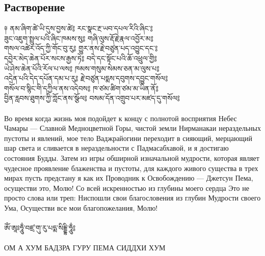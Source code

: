 \subsection{Растворение}
\vspace{0.5cm}
\ti
༈ ནམ་ཞིག་ཚེ་ཡི་དུས་བྱས་ཚེ༔ རང་སྣང་རྔ་ཡབ་དཔལ་རིའི་ཞིང་༔\\
ཟུང་འཇུག་སྤྲུལ་པའི་ཞིང་ཁམས་སུ༔ གཞི་ལུས་རྡོ་རྗེ་རྣལ་འབྱོར་མ༔\\
གསལ་འཚེར་འོད་ཀྱི་གོང་བུ་རུ༔ གྱུར་ནས་རྗེ་བཙུན་པད་འབྱུང་དང་༔\\
དབྱེར་མེད་ཆེན་པོར་སངས་རྒྱས་ཏེ༔ བདེ་དང་སྟོང་པའི་ཆོ་འཕྲུལ་གྱི༔\\
ཡེ་ཤེས་ཆེན་པོའི་རོལ་པ་ལས༔ ཁམས་གསུམ་སེམས་ཅན་མ་ལུས་པ༔\\
འདྲེན་པའི་དེད་དཔོན་དམ་པ་རུ༔ རྗེ་བཙུན་པདྨས་དབུགས་དབྱུང་གསོལ༔\\
གསོལ་བ་སྙིང་གི་དཀྱིལ་ནས་འདེབས༔ ཁ་ཙམ་ཚིག་ཙམ་མ་ཡིན་ནོ༔\\
བྱིན་རླབས་ཐུགས་ཀྱི་ཀློང་ནས་སྩོལ༔ བསམ་དོན་འགྲུབ་པར་མཛད་དུ་གསོལ༔\\
\\
\ru
Во время когда жизнь моя подойдет к концу
с полнотой восприятия Небес Чамары — Славной Медноцветной Горы,
чистой земли Нирманакаи нераздельных пустоты и явлений,
мое тело Ваджрайогини переходит в сияющий, мерцающий шар света
и сливается в нераздельности с Падмасабхавой,
и я достигаю состояния Будды.
Затем из игры обширной изначальной мудрости,
которая являет чудесное проявление блаженства и пустоты,
для каждого живого существа в трех мирах пусть предстану я как их Проводник к Освобождению —
Джетсун Пема, осуществи это, Молю! Со всей искренностью из глубины моего сердца
Это не просто слова или треп:
Ниспошли свои благословения из глубин Мудрости своего Ума,
Осуществи все мои благопожелания, Молю!
\\
\vspace{0.5cm}
\\
\ti ཨོཾ་ཨཱཿཧཱུྂ་བཛྲ་གུ་རུ་པདྨ་སིདྡྷི་ཧཱུྂ༔\\
\\
\ru ОМ А ХУМ БАДЗРА ГУРУ ПЕМА СИДДХИ ХУМ\\

